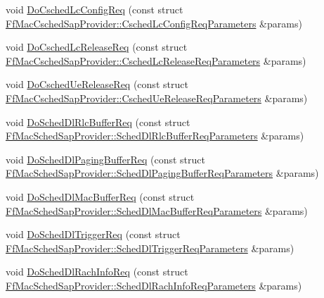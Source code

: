 \begin{DoxyCompactItemize}
\item 
void \hyperlink{classns3_1_1RrFfMacScheduler_a94a9729ee4caa9c4680a7a215da09110}{Do\+Csched\+Lc\+Config\+Req} (const struct \hyperlink{structns3_1_1FfMacCschedSapProvider_1_1CschedLcConfigReqParameters}{Ff\+Mac\+Csched\+Sap\+Provider\+::\+Csched\+Lc\+Config\+Req\+Parameters} \&params)
\item 
void \hyperlink{classns3_1_1RrFfMacScheduler_a26142b9d1752cc381570d750ba4c41fb}{Do\+Csched\+Lc\+Release\+Req} (const struct \hyperlink{structns3_1_1FfMacCschedSapProvider_1_1CschedLcReleaseReqParameters}{Ff\+Mac\+Csched\+Sap\+Provider\+::\+Csched\+Lc\+Release\+Req\+Parameters} \&params)
\item 
void \hyperlink{classns3_1_1RrFfMacScheduler_a908973f6b1f82083db6ba005c4d9d761}{Do\+Csched\+Ue\+Release\+Req} (const struct \hyperlink{structns3_1_1FfMacCschedSapProvider_1_1CschedUeReleaseReqParameters}{Ff\+Mac\+Csched\+Sap\+Provider\+::\+Csched\+Ue\+Release\+Req\+Parameters} \&params)
\item 
void \hyperlink{classns3_1_1RrFfMacScheduler_a39012d4f997e44b7556cb3d37ba12187}{Do\+Sched\+Dl\+Rlc\+Buffer\+Req} (const struct \hyperlink{structns3_1_1FfMacSchedSapProvider_1_1SchedDlRlcBufferReqParameters}{Ff\+Mac\+Sched\+Sap\+Provider\+::\+Sched\+Dl\+Rlc\+Buffer\+Req\+Parameters} \&params)
\item 
void \hyperlink{classns3_1_1RrFfMacScheduler_aaa824d0095477a8844293e19ef21f0e3}{Do\+Sched\+Dl\+Paging\+Buffer\+Req} (const struct \hyperlink{structns3_1_1FfMacSchedSapProvider_1_1SchedDlPagingBufferReqParameters}{Ff\+Mac\+Sched\+Sap\+Provider\+::\+Sched\+Dl\+Paging\+Buffer\+Req\+Parameters} \&params)
\item 
void \hyperlink{classns3_1_1RrFfMacScheduler_a8d66ee99af6387c754d9d6aeb15ae97d}{Do\+Sched\+Dl\+Mac\+Buffer\+Req} (const struct \hyperlink{structns3_1_1FfMacSchedSapProvider_1_1SchedDlMacBufferReqParameters}{Ff\+Mac\+Sched\+Sap\+Provider\+::\+Sched\+Dl\+Mac\+Buffer\+Req\+Parameters} \&params)
\item 
void \hyperlink{classns3_1_1RrFfMacScheduler_a185c818311c062bfc0af357e94d49e1e}{Do\+Sched\+Dl\+Trigger\+Req} (const struct \hyperlink{structns3_1_1FfMacSchedSapProvider_1_1SchedDlTriggerReqParameters}{Ff\+Mac\+Sched\+Sap\+Provider\+::\+Sched\+Dl\+Trigger\+Req\+Parameters} \&params)
\item 
void \hyperlink{classns3_1_1RrFfMacScheduler_a9b45e1b90349f320a636ab0aa74347a8}{Do\+Sched\+Dl\+Rach\+Info\+Req} (const struct \hyperlink{structns3_1_1FfMacSchedSapProvider_1_1SchedDlRachInfoReqParameters}{Ff\+Mac\+Sched\+Sap\+Provider\+::\+Sched\+Dl\+Rach\+Info\+Req\+Parameters} \&params)

\end{DoxyCompactItemize}
